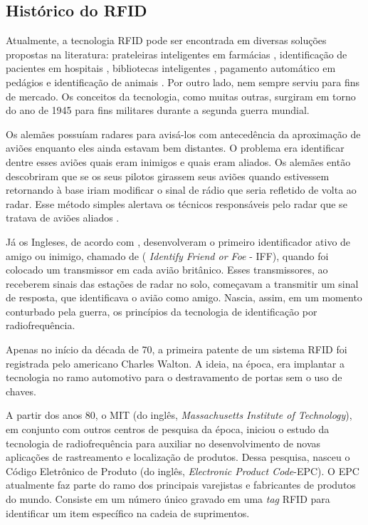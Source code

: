\documentclass[tcc,capa]{texufpel}
\begin{document}
        \subsection{Histórico do RFID}
        
             Atualmente, a tecnologia RFID pode ser encontrada em diversas soluções propostas na literatura: prateleiras inteligentes em farmácias \cite{wen2012application}, identificação de pacientes em hospitais \cite{chowdhury2007rfid}, bibliotecas inteligentes \cite{boss2003rfid}, pagamento automático em pedágios \cite{kalantri2014rfid} e identificação de animais \cite{voulodimos2010complete}.      Por outro lado, nem sempre serviu para fins de mercado. Os conceitos da tecnologia, como muitas outras, surgiram em torno do ano de 1945 para fins militares durante a segunda guerra mundial. 
              
            Os alemães possuíam radares para avisá-los com antecedência da aproximação de aviões enquanto eles ainda estavam bem distantes. O problema era identificar dentre esses aviões quais eram inimigos e quais eram aliados. Os alemães então descobriram que se os seus pilotos girassem seus aviões quando estivessem retornando à base iriam modificar o sinal de rádio que seria refletido de volta ao radar. Esse método simples alertava os técnicos responsáveis pelo radar que se tratava de aviões aliados \cite{ oliveira2010estudo}.
            
            Já os Ingleses, de acordo com \cite{fonseca2008desenvolvimento}, desenvolveram o primeiro identificador ativo de amigo ou inimigo, chamado de  ( \textit{Identify Friend or Foe} - IFF), quando foi colocado um transmissor em cada avião britânico. Esses transmissores, ao receberem sinais das estações de radar no solo, começavam a transmitir um sinal de resposta, que identificava o avião como amigo. Nascia, assim, em um momento conturbado pela guerra, os princípios da tecnologia de identificação por radiofrequência. %
            
            Apenas no início da década de 70, a primeira patente de um sistema RFID foi registrada pelo americano Charles Walton. A ideia, na época, era implantar a tecnologia no ramo automotivo para o destravamento de portas sem o uso de chaves.
            
            A partir dos anos 80, o MIT (do inglês, \textit{ Massachusetts Institute of Technology}), em conjunto com outros centros de pesquisa da época, iniciou o estudo da tecnologia de radiofrequência para auxiliar no desenvolvimento de novas aplicações de rastreamento e localização de produtos. Dessa pesquisa, nasceu o Código Eletrônico de Produto (do inglês,\textit{ Electronic Product Code}-EPC). O EPC atualmente faz parte do ramo dos principais varejistas e fabricantes de produtos do mundo. Consiste em um número único gravado em uma \textit{tag} RFID para identificar um item específico na cadeia de suprimentos.
             
\end{document}
